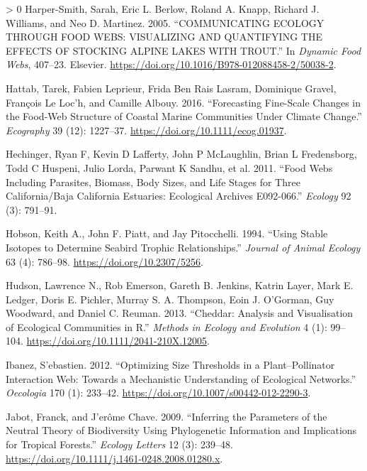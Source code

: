\documentclass{article}
\newlength{\cslhangindent}
\newenvironment{CSLReferences}[3] %
 {%
  \setlength{\parindent}{0pt}
  \ifodd #1 \everypar{\setlength{\hangindent}{\cslhangindent}}\ignorespaces\fi
  \ifnum #2 > 0
  \setlength{\parskip}{#2\baselineskip}
  \fi
 }%
 {}
\begin{document}
\begin{CSLReferences}{1}{0}
\leavevmode\hypertarget{ref-harper-smithCOMMUNICATINGECOLOGYFOOD2005}{}%
Harper-Smith, Sarah, Eric L. Berlow, Roland A. Knapp, Richard J.
Williams, and Neo D. Martinez. 2005. {``{COMMUNICATING ECOLOGY THROUGH
FOOD WEBS}: {VISUALIZING AND QUANTIFYING THE EFFECTS OF STOCKING ALPINE
LAKES WITH TROUT}.''} In \emph{Dynamic {Food Webs}}, 407--23.
{Elsevier}. \url{https://doi.org/10.1016/B978-012088458-2/50038-2}.

\leavevmode\hypertarget{ref-hattabForecastingFinescaleChanges2016}{}%
Hattab, Tarek, Fabien Leprieur, Frida Ben Rais Lasram, Dominique Gravel,
François Le Loc'h, and Camille Albouy. 2016. {``Forecasting Fine-Scale
Changes in the Food-Web Structure of Coastal Marine Communities Under
Climate Change.''} \emph{Ecography} 39 (12): 1227--37.
\url{https://doi.org/10.1111/ecog.01937}.

\leavevmode\hypertarget{ref-hechinger2011food}{}%
Hechinger, Ryan F, Kevin D Lafferty, John P McLaughlin, Brian L
Fredensborg, Todd C Huspeni, Julio Lorda, Parwant K Sandhu, et al. 2011.
{``Food Webs Including Parasites, Biomass, Body Sizes, and Life Stages
for Three California/Baja California Estuaries: Ecological Archives
E092-066.''} \emph{Ecology} 92 (3): 791--91.

\leavevmode\hypertarget{ref-hobsonUsingStableIsotopes1994}{}%
Hobson, Keith A., John F. Piatt, and Jay Pitocchelli. 1994. {``Using
{Stable Isotopes} to {Determine Seabird Trophic Relationships}.''}
\emph{Journal of Animal Ecology} 63 (4): 786--98.
\url{https://doi.org/10.2307/5256}.

\leavevmode\hypertarget{ref-hudsonCheddarAnalysisVisualisation2013}{}%
Hudson, Lawrence N., Rob Emerson, Gareth B. Jenkins, Katrin Layer, Mark
E. Ledger, Doris E. Pichler, Murray S. A. Thompson, Eoin J. O'Gorman,
Guy Woodward, and Daniel C. Reuman. 2013. {``Cheddar: Analysis and
Visualisation of Ecological Communities in {R}.''} \emph{Methods in
Ecology and Evolution} 4 (1): 99--104.
\url{https://doi.org/10.1111/2041-210X.12005}.

\leavevmode\hypertarget{ref-ibanezOptimizingSizeThresholds2012}{}%
Ibanez, S'ebastien. 2012. {``Optimizing Size Thresholds in a
Plant--Pollinator Interaction Web: Towards a Mechanistic Understanding
of Ecological Networks.''} \emph{Oecologia} 170 (1): 233--42.
\url{https://doi.org/10.1007/s00442-012-2290-3}.

\leavevmode\hypertarget{ref-jabotInferringParametersNeutral2009}{}%
Jabot, Franck, and J'erôme Chave. 2009. {``Inferring the Parameters of
the Neutral Theory of Biodiversity Using Phylogenetic Information and
Implications for Tropical Forests.''} \emph{Ecology Letters} 12 (3):
239--48. \url{https://doi.org/10.1111/j.1461-0248.2008.01280.x}.


\end{CSLReferences}
\end{document}
